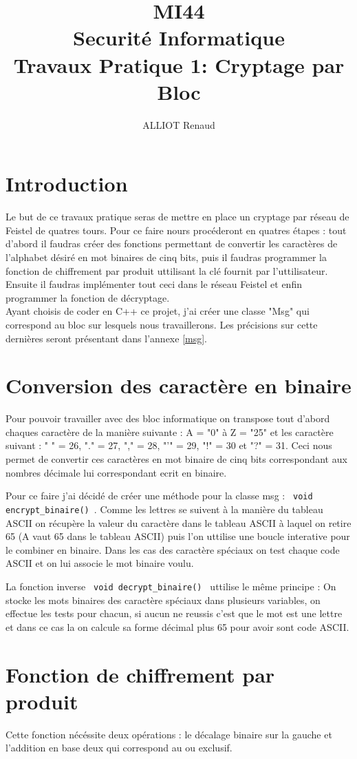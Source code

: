 \documentclass[10pt,a4paper]{article}
\author{ALLIOT Renaud}
\title{MI44\\Securité Informatique\\Travaux Pratique 1: Cryptage par Bloc}
\begin{document}
\maketitle
\newpage
\section{Introduction}
Le but de ce travaux pratique seras de mettre en place un cryptage par réseau de Feistel de quatres tours. Pour ce faire nours procéderont en quatres étapes : tout d'abord il faudras créer des fonctions permettant de convertir les caractères de l'alphabet désiré en mot binaires de cinq bits, puis il faudras programmer la fonction de chiffrement par produit uttilisant la clé fournit par l'uttilisateur. Ensuite il faudras implémenter tout ceci dans le réseau Feistel et enfin programmer la fonction de décryptage.\\
Ayant choisis de coder en C++ ce projet, j'ai créer une classe "Msg" qui correspond au bloc sur lesquels nous travaillerons. Les précisions sur cette dernières seront présentant dans l'annexe \ref{msg}.
\section{Conversion des caractère en binaire}
Pour pouvoir travailler avec des bloc informatique on transpose tout d'abord chaques caractère de la manière suivante : A = "0" à Z = "25" et les  caractère suivant : " " = 26, "." = 27, "," = 28, "'" = 29, "!" = 30 et "?" = 31. Ceci nous permet de convertir ces caractères en mot binaire de cinq bits correspondant aux nombres décimale lui correspondant ecrit en binaire.


Pour ce faire j'ai décidé de créer une méthode pour la classe msg : \verb| void encrypt_binaire() |. Comme les lettres se suivent à la manière du tableau ASCII on récupère la valeur du caractère dans le tableau ASCII à laquel on retire 65 (A vaut 65 dans le tableau ASCII) puis l'on uttilise une boucle interative pour le combiner en binaire. Dans les cas des caractère spéciaux on test chaque code ASCII et on lui associe le mot binaire voulu.

La fonction inverse \verb| void decrypt_binaire() | uttilise le même principe : On stocke les mots binaires des caractère spéciaux dans plusieurs variables, on effectue les tests pour chacun, si aucun ne reussis c'est que le mot est une lettre et dans ce cas la on calcule sa forme décimal plus 65 pour avoir sont code ASCII.
\section{Fonction de chiffrement par produit}
Cette fonction nécéssite deux opérations : le décalage binaire sur la gauche et l'addition en base deux qui correspond au ou exclusif.
\end{document}
